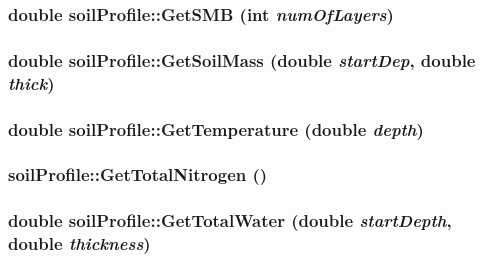 \label{classsoil_profile_a2991385a93a7624c9aaa7bb395464943}
\hypertarget{classsoil_profile_ad28b9757b77fa71db68254995c254cf2}{
\subsubsection[{GetSMB}]{\setlength{\rightskip}{0pt plus 5cm}double soilProfile::GetSMB (int {\em numOfLayers})}}
\label{classsoil_profile_ad28b9757b77fa71db68254995c254cf2}
\hypertarget{classsoil_profile_a3f6845a54d38bc96d3c746c3e1875415}{
\subsubsection[{GetSoilMass}]{\setlength{\rightskip}{0pt plus 5cm}double soilProfile::GetSoilMass (double {\em startDep}, \/  double {\em thick})}}
\label{classsoil_profile_a3f6845a54d38bc96d3c746c3e1875415}
\hypertarget{classsoil_profile_a0ce7a0cacb136fae92fac737f23fe46f}{
\subsubsection[{GetTemperature}]{\setlength{\rightskip}{0pt plus 5cm}double soilProfile::GetTemperature (double {\em depth})}}
\label{classsoil_profile_a0ce7a0cacb136fae92fac737f23fe46f}
\hypertarget{classsoil_profile_aaed7e24507f4b6af78401c985ab1cc12}{
\subsubsection[{GetTotalNitrogen}]{ soilProfile::GetTotalNitrogen ()}}
\label{classsoil_profile_aaed7e24507f4b6af78401c985ab1cc12}
\hypertarget{classsoil_profile_a3a8791cd9244ae7c70246be2e5a27b02}{
\subsubsection[{GetTotalWater}]{\setlength{\rightskip}{0pt plus 5cm}double soilProfile::GetTotalWater (double {\em startDepth}, \/  double {\em thickness})}}

